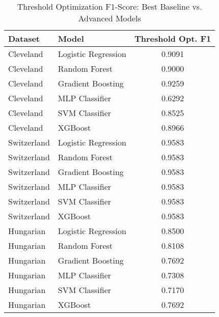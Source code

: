 \documentclass{article}
\begin{document}
\begin{table}[htbp]
\centering
\caption{Threshold Optimization F1-Score: Best Baseline vs. Advanced Models}
\label{tab:advanced_comparison_thresh_opt}
\begin{tabular}{llc}
\toprule
Dataset     & Model                & Threshold Opt. F1 \\
\midrule
Cleveland   & Logistic Regression  & 0.9091    \\
Cleveland   & Random Forest        & 0.9000    \\
Cleveland   & Gradient Boosting    & 0.9259    \\
Cleveland   & MLP Classifier       & 0.6292    \\
Cleveland   & SVM Classifier       & 0.8525    \\
Cleveland   & XGBoost              & 0.8966    \\
\midrule
Switzerland & Logistic Regression  & 0.9583    \\
Switzerland & Random Forest        & 0.9583    \\
Switzerland & Gradient Boosting    & 0.9583    \\
Switzerland   & MLP Classifier       & 0.9583    \\
Switzerland & SVM Classifier       & 0.9583    \\
Switzerland & XGBoost              & 0.9583    \\
\midrule
Hungarian   & Logistic Regression  & 0.8500    \\
Hungarian   & Random Forest        & 0.8108    \\
Hungarian   & Gradient Boosting    & 0.7692    \\
Hungarian   & MLP Classifier       & 0.7308    \\
Hungarian   & SVM Classifier       & 0.7170    \\
Hungarian   & XGBoost              & 0.7692    \\
\bottomrule
\end{tabular}
\end{table}
\end{document}
